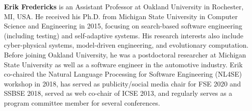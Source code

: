 \documentclass[10pt,conference]{IEEEtran}
\newcommand{\TODO}[1]{\textbf{\textcolor{ScarletRed}{[TODO: #1]}}\xspace}
\newcommand{\TODO}[1]{}
\begin{document}
{\bf Erik Fredericks} is an Assistant Professor at Oakland University
in Rochester, MI, USA.  He received his Ph.D. from Michigan State University in
Computer Science and Engineering in 2015, focusing on search-based software engineering (including testing)
and self-adaptive systems.  His research interests also include cyber-physical systems,
model-driven engineering, and evolutionary computation.  Before joining Oakland University,
he was a postdoctoral researcher at Michigan State University as well as a software engineer
in the automotive industry.  Erik co-chaired the Natural Language Processing for Software Engineering (NL4SE)
workshop in 2018, has served as publicity/social media chair for FSE 2020 and SSBSE 2018,
served as web co-chair of ICSE 2013, and regularly serves as a program committee member for several conferences.









\end{document}
